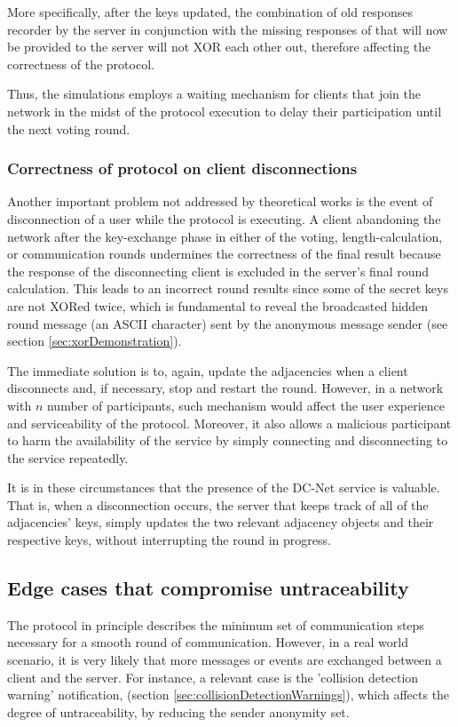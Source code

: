 More specifically, after the keys updated, the combination of old responses recorder by the server in conjunction with the missing responses of that will now be provided to the server will not XOR each other out, therefore affecting the correctness of the protocol.

Thus, the simulations employs a waiting mechanism for clients that join the network in the midst of the protocol execution to delay their participation until the next voting round.

\subsubsection{Correctness of protocol on client disconnections}
Another important problem not addressed by theoretical works is the event of disconnection of a user while the protocol is executing. A client abandoning the network after the key-exchange phase in either of the voting, length-calculation, or communication rounds undermines the correctness of the final result because the response of the disconnecting client is excluded in the server's final round calculation. This leads to an incorrect round results since some of the secret keys are not XORed twice, which is fundamental to reveal the broadcasted hidden round message (an ASCII character) sent by the anonymous message sender (see section \ref{sec:xorDemonstration}).

The immediate solution is to, again, update the adjacencies when a client disconnects and, if necessary, stop and restart the round. However, in a network with $n$ number of participants, such mechanism would affect the user experience and serviceability of the protocol. Moreover, it also allows a malicious participant to harm the availability of the service by simply connecting and disconnecting to the service repeatedly.

It is in these circumstances that the presence of the DC-Net service is valuable. That is, when a disconnection occurs, the server that keeps track of all of the adjacencies' keys, simply updates the two relevant adjacency objects and their respective keys, without interrupting the round in progress.

\subsection{Edge cases that compromise untraceability}
The protocol in principle describes the minimum set of communication steps necessary for a smooth round of communication. However, in a real world scenario, it is very likely that more messages or events are exchanged between a client and the server. For instance, a relevant case is the 'collision detection warning' notification, (section \ref{sec:collisionDetectionWarnings}), which affects the degree of untraceability, by reducing the sender anonymity set. 

